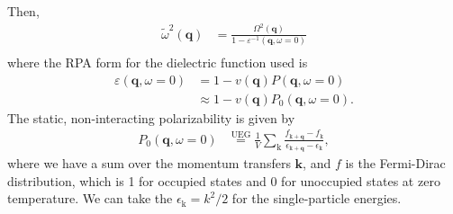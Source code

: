 Then,
\begin{align}
\tilde{\omega}^2(\mathbf{q}) &= \frac{\Omega^2(\mathbf{q})}{1 - \varepsilon^{-1}(\mathbf{q},\omega=0)}\\
\end{align}
where the RPA form for the dielectric function used is
\begin{align}
\varepsilon(\mathbf{q}, \omega=0)&=1-v(\mathbf{q}) P(\mathbf{q}, \omega=0)\\
&\approx 1-v(\mathbf{q}) P_0(\mathbf{q}, \omega=0).
\end{align}
The static, non-interacting polarizability is given by
\begin{align}
P_0(\mathbf{q}, \omega=0)
&\overset{\text{UEG}}{=} \frac{1}{V} \sum_{\mathrm{k}} \frac{f_{\mathrm{k}+\mathbf{q}}-f_{\mathrm{k}}}{\epsilon_{\mathrm{k}+\mathbf{q}}-\epsilon_{\mathrm{k}}},
\end{align}
where we have a sum over the momentum transfers $\mathbf{k}$, and $f$ is the Fermi-Dirac distribution, which is 1 for occupied states and 0 for unoccupied states at zero temperature. We can take the $\epsilon_{\mathrm{k}} = k^2/2$ for the single-particle energies.
